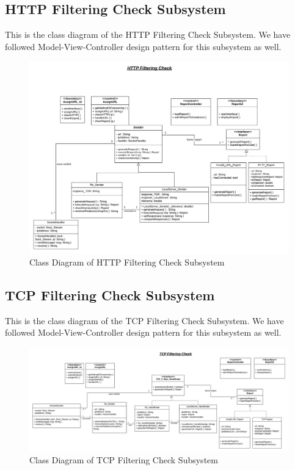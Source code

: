 \documentclass[12pt]{article}
\begin{document}
\subsection{HTTP Filtering Check Subsystem}
This is the class diagram of the HTTP Filtering Check Subsystem.
We have followed Model-View-Controller design pattern for this subsystem as well.
\begin{figure}[h]
    \centering
    \includegraphics[width=\textwidth]{cdhttp2.png}
    \caption{Class Diagram of HTTP Filtering Check Subsystem}
    \label{fig:cdhttp}
\end{figure}

\newpage
\subsection{TCP Filtering Check Subsystem}
This is the class diagram of the TCP Filtering Check Subsystem.
We have followed Model-View-Controller design pattern for this subsystem as well.
\begin{figure}[h]
    \centering
    \includegraphics[width=\textwidth]{cdtcp.png}
    \caption{Class Diagram of TCP Filtering Check Subsystem}
    \label{fig:cdtcp}
\end{figure}
\end{document}
